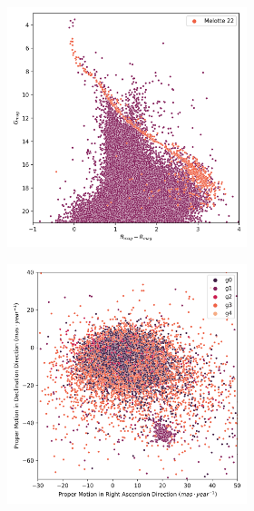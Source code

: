 \documentclass[11pt,a4paper,english,twocolumn]{article}
\begin{document}
\begin{figure}[htbp]
\begin{subfigure}{\columnwidth}
\begin{subfigure}[t]{0.30\textwidth}
    \end{subfigure}
    \hfill
    \begin{subfigure}[t]{0.30\textwidth}
      \centering
      \includegraphics[width=\textwidth]{../figures/melotte_22/hr_diagram_melotte_22.png}
    \end{subfigure}
  \end{subfigure}
  \centering
  \begin{subfigure}{\columnwidth}
    \centering
    \begin{subfigure}[t]{0.30\textwidth}
      \centering
      \includegraphics[width=\textwidth]{../figures/melotte_22/kmeans_pm_melotte_22.png}

\end{subfigure}
\end{subfigure}
\end{figure}
\end{document}
